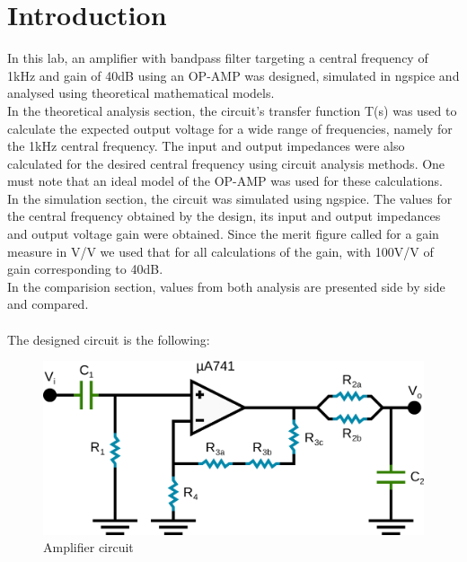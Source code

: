\section{Introduction}
\label{sec:intro}
In this lab, an amplifier with bandpass filter targeting a central frequency of 1kHz and gain of 40dB using an OP-AMP was designed, simulated in ngspice and analysed using theoretical mathematical models.\\
 In the theoretical analysis section, the circuit's transfer function T(s) was used to calculate the expected output voltage for a wide range of frequencies, namely for the 1kHz central frequency. The input and output impedances were also calculated for the desired central frequency using circuit analysis methods. One must note that an ideal model of the OP-AMP was used for these calculations. \\
 In the simulation section, the circuit was simulated using ngspice. The values for the central frequency obtained by the design, its input and output impedances and output voltage gain were obtained. Since the merit figure called for a gain measure in V/V we used that for all calculations of the gain, with 100V/V of gain corresponding to 40dB.\\
In the comparision section, values from both analysis are presented side by side and compared.\\ \\
The designed circuit is the following:

\begin{figure} [!htb] 
  \includegraphics[width=\linewidth]{circuit.png}
  \vspace{1cm}
  \caption{Amplifier circuit}
  \label{fig:circuit}
  \hfill
\end{figure}



\FloatBarrier
